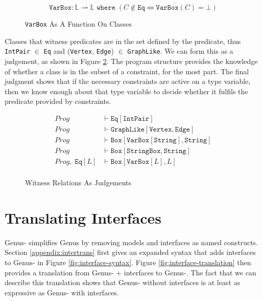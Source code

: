 \begin{figure}[H]
    \centering
    \begin{equation*}
        \texttt{VarBox} : \mathbb{L} \rightharpoonup \mathbb{L} \; \texttt{where} \; (C \notin \texttt{Eq} \iff \texttt{VarBox}(C) = \bot)
    \end{equation*}
    \caption{\texttt{VarBox} As A Function On Classes}
    \label{fig:varbox-func}
\end{figure}

Classes that witness predicates are in the set defined by the predicate, thus \texttt{IntPair} $\in$ \texttt{Eq} and (\texttt{Vertex}, \texttt{Edge}) $\in$ \texttt{GraphLike}. We can form this as a judgement, as shown in Figure \ref{fig:pred-judgement}. The program structure provides the knowledge of whether a class is in the subset of a constraint, for the most part. The final judgment shows that if the necessary constraints are active on a type variable, then we know enough about that type variable to decide whether it fulfils the predicate provided by constraints. \\

\begin{figure}[H]
    \centering
    \begin{align*}
        Prog &\vdash \texttt{Eq}[\texttt{IntPair}] \\
        Prog &\vdash \texttt{GraphLike}[\texttt{Vertex}, \texttt{Edge}] \\
        Prog &\vdash \texttt{Box}[\texttt{VarBox}[\texttt{String}], \texttt{String}] \\
        Prog &\vdash \texttt{Box}[\texttt{StringBox}, \texttt{String}] \\
        Prog, \; \texttt{Eq}[L] &\vdash \texttt{Box}[\texttt{VarBox}[L], L] \\
    \end{align*}
    \caption{Witness Relations As Judgements}
    \label{fig:pred-judgement}
\end{figure}

\newpage

\section{Translating Interfaces} \label{sec:translation}

Genus- simplifies Genus by removing models and interfaces as named constructs. Section \ref{appendix:intertrans} first gives an expanded syntax that adds interfaces to Genus- in Figure \ref{fig:interface-syntax}. Figure \ref{fig:interface-translation} then provides a translation from Genus- + interfaces to Genus-. The fact that we can describe this translation shows that Genus- without interfaces is at least as expressive as Genus- with interfaces. \\

